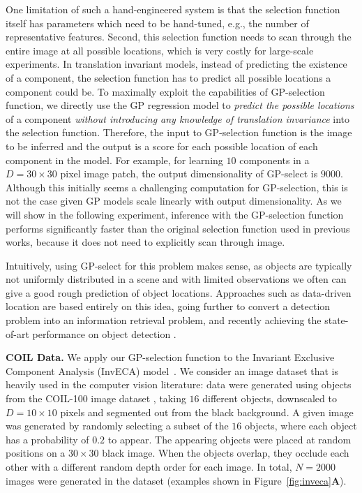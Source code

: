 One limitation of such a hand-engineered system is that the selection function itself has parameters which need to be hand-tuned, e.g., the number of representative features.%
Second, this selection function needs to scan through the entire image at all possible locations, which is very costly for large-scale experiments.
%
In translation invariant models, instead of predicting the existence of a component, the selection function has to predict all possible locations a component could be.
To maximally exploit the capabilities of GP-selection function, we directly use the GP regression model to \textit{predict the possible locations} of a component \textit{without introducing any knowledge of translation invariance} into the selection function.
Therefore, the input to GP-selection function is the image to be inferred and the output is a score for each possible location of each component in the model.
For example, for learning $10$ components in a $D=30\times 30$ pixel image patch, the output dimensionality of GP-select is $9000$.
Although this initially seems a challenging computation for GP-selection, this is not the case given GP models scale linearly with output dimensionality.
As we will show in the following experiment, inference with the GP-selection function performs significantly faster than the original selection function used in previous works, because it does not need to explicitly scan through image.

Intuitively, using GP-select for this problem makes sense, as objects are typically not uniformly distributed in a scene and with limited  observations we often can give a good rough prediction of object locations.
Approaches such as data-driven location are based entirely on this idea, going further to convert a detection problem into an information retrieval problem, and recently achieving the state-of-art performance on object detection \citep{Rodriguez-SerranoL13}.



\textbf{COIL Data.}
We apply our GP-selection function to the Invariant Exclusive Component Analysis (InvECA) model~\citep{DaiEtAl2013}.
We consider an image dataset that is heavily used in the computer vision literature: data were generated using objects from the COIL-100 image dataset \citep{coil100}, taking $16$ different objects, downscaled to $D=10 \times 10$ pixels and segmented out from the black background.
A given image was generated by randomly selecting a subset of the $16$ objects, where each object has a probability of $0.2$ to appear.
The appearing objects were placed at random positions on a $30 \times 30$ black image.
When the objects overlap, they occlude each other with a different random depth order for each image.
In total, $N=2000$ images were generated in the dataset (examples shown in Figure~\ref{fig:inveca}\textbf{A}).


